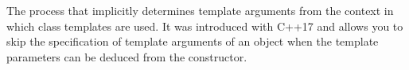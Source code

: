 


The process that implicitly determines template arguments from the context in which class templates are used. It was introduced with C++17 and allows you to skip the specification of template arguments of an object when the template parameters can be deduced from the constructor.